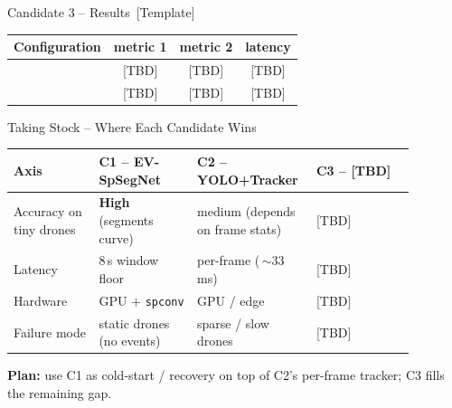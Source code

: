 \documentclass[aspectratio=169,11pt]{beamer}
\begin{document}
\begin{frame}{Candidate 3 -- Results \,[Template]}
  \vspace{0.4em}
  \centering
  \begin{darkbox}[width=0.88\paperwidth]
    \centering
    \renewcommand{\arraystretch}{1.3}
    \begin{tabular}{lccc}
      Configuration & metric 1 & metric 2 & latency\\
      \hline
      [Method A]   & [TBD] & [TBD] & [TBD]\\
      [Method B]   & [TBD] & [TBD] & [TBD]\\
    \end{tabular}
  \end{darkbox}
\end{frame}

\begin{frame}{Taking Stock -- Where Each Candidate Wins}
  \vspace{0.4em}
  \centering
  \begin{darkbox}[width=0.96\paperwidth]
    \renewcommand{\arraystretch}{1.4}
    \begin{tabular}{p{0.20\linewidth}p{0.23\linewidth}p{0.22\linewidth}p{0.23\linewidth}}
      \textbf{Axis} & \textbf{C1 -- EV-SpSegNet} & \textbf{C2 -- YOLO+Tracker} & \textbf{C3 -- [TBD]}\\
      \hline
      Accuracy on tiny drones & \textbf{High} (segments curve) & medium (depends on frame stats) & [TBD]\\
      Latency                 & 8\,s window floor & per-frame (\,$\sim$33\,ms) & [TBD]\\
      Hardware                & GPU $+$ \texttt{spconv} & GPU / edge & [TBD]\\
      Failure mode            & static drones (no events) & sparse / slow drones & [TBD]\\
    \end{tabular}
  \end{darkbox}
  \vspace{0.6em}
  {\small \textbf{Plan:} use C1 as cold-start / recovery on top of C2's per-frame tracker;
   C3 fills the remaining gap.}
\end{frame}
\end{document}
